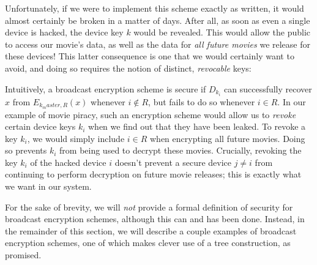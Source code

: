 Unfortunately, if we were to implement this scheme exactly as written,
it would almost certainly be broken in a matter of days. After all, as
soon as even a single device is hacked, the device key \(k\) would be
revealed. This would allow the public to access our movie's data, as
well as the data for \emph{all future movies} we release for these
devices! This latter consequence is one that we would certainly want to
avoid, and doing so requires the notion of distinct, \emph{revocable}
keys:

\hypertarget{broadcastdef}{}

Intuitively, a broadcast encryption scheme is secure if \(D_{k_i}\) can
successfully recover \(x\) from \(E_{k_master, R}(x)\) whenever
\(i \notin R\), but fails to do so whenever \(i \in R\). In our example
of movie piracy, such an encryption scheme would allow us to
\emph{revoke} certain device keys \(k_i\) when we find out that they
have been leaked. To revoke a key \(k_i\), we would simply include
\(i \in R\) when encrypting all future movies. Doing so prevents \(k_i\)
from being used to decrypt these movies. Crucially, revoking the key
\(k_i\) of the hacked device \(i\) doesn't prevent a secure device
\(j \neq i\) from continuing to perform decryption on future movie
releases; this is exactly what we want in our system.

For the sake of brevity, we will \emph{not} provide a formal definition
of security for broadcast encryption schemes, although this can and has
been done. Instead, in the remainder of this section, we will describe a
couple examples of broadcast encryption schemes, one of which makes
clever use of a tree construction, as promised.

